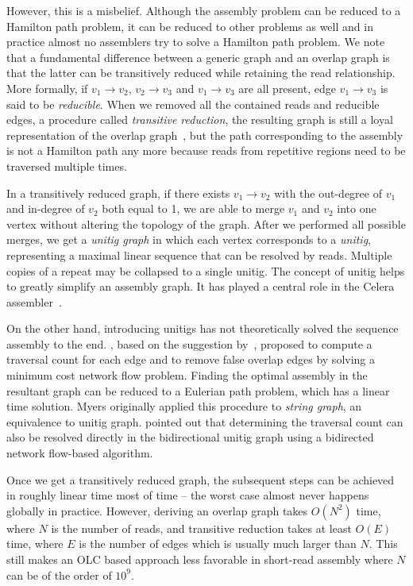 \documentclass{bioinfo}
\begin{document}
\begin{methods}
However, this is a misbelief. Although the assembly problem can be reduced to a
Hamilton path problem, it can be reduced to other problems as well and in
practice almost no assemblers try to solve a Hamilton path problem.  We note
that a fundamental difference between a generic graph and an overlap graph is
that the latter can be transitively reduced while retaining the read
relationship. More formally, if $v_1\to v_2$, $v_2\to v_3$ and $v_1\to v_3$ are
all present, edge $v_1\to v_3$ is said to be \emph{reducible}. When we removed
all the contained reads and reducible edges, a procedure called
\emph{transitive reduction}, the resulting graph is still a loyal
representation of the overlap graph~\citep{Myers:1995nx}, but the path
corresponding to the assembly is not a Hamilton path any more because reads
from repetitive regions need to be traversed multiple times.

In a transitively reduced graph, if there exists $v_1\to v_2$ with the
out-degree of $v_1$ and in-degree of $v_2$ both equal to 1, we are able to
merge $v_1$ and $v_2$ into one vertex without altering the topology of the
graph. After we performed all possible merges, we get a \emph{unitig graph} in
which each vertex corresponds to a \emph{unitig}, representing a maximal linear
sequence that can be resolved by reads. Multiple copies of a repeat may be
collapsed to a single unitig. The concept of unitig helps to greatly simplify
an assembly graph. It has played a central role in the Celera
assembler~\citep{Myers:2000kl}.

On the other hand, introducing unitigs has not theoretically solved the
sequence assembly to the end. \citet{Myers:2005bh}, based on the suggestion
by~\citet{Pevzner:2001vn}, proposed to compute a traversal count for each edge
and to remove false overlap edges by solving a minimum cost network flow
problem. Finding the optimal assembly in the resultant graph can be reduced to
a Eulerian path problem, which has a linear time solution. Myers originally
applied this procedure to \emph{string graph}, an equivalence to unitig graph.
\citet{DBLP:conf/wabi/MedvedevGMB07} pointed out that determining the traversal count can
also be resolved directly in the bidirectional unitig graph using a bidirected
network flow-based algorithm.

Once we get a transitively reduced graph, the subsequent steps can be achieved
in roughly linear time most of time -- the worst case almost never happens
globally in practice. However, deriving an overlap graph takes $O(N^2)$ time,
where $N$ is the number of reads, and transitive reduction takes at least
$O(E)$ time, where $E$ is the number of edges which is usually much larger than
$N$. This still makes an OLC based approach less favorable in short-read
assembly where $N$ can be of the order of $10^9$.


\end{methods}
\end{document}
